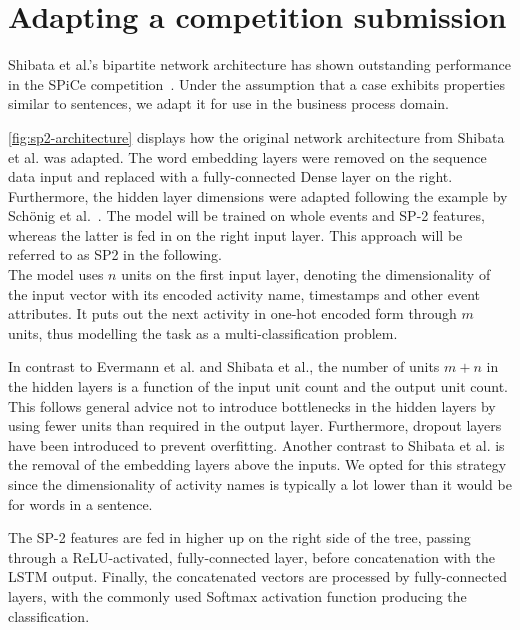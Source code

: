 \section{Adapting a competition submission}\label{sec:contrib:sp2-inspiration}
Shibata et al.'s bipartite network architecture has shown outstanding performance in the SPiCe competition~\cite{web:spice}. Under the assumption that a case exhibits properties similar to sentences, we adapt it for use in the business process domain.

\autoref{fig:sp2-architecture} displays how the original network architecture from Shibata et al. was adapted. The word embedding layers were removed on the sequence data input and replaced with a fully-connected Dense layer on the right. Furthermore, the hidden layer dimensions were adapted following the example by Schönig et al.~\cite{schoenig2018}. The model will be trained on whole events and SP-2 features, whereas the latter is fed in on the right input layer. This approach will be referred to as SP2 in the following.\\

The model uses $n$ units on the first input layer, denoting the dimensionality of the input vector with its encoded activity name, timestamps and other event attributes. It puts out the next activity in one-hot encoded form through $m$ units, thus modelling the task as a multi-classification problem.

In contrast to Evermann et al. and Shibata et al., the number of units $m+n$ in the hidden layers is a function of the input unit count and the output unit count. This follows general advice not to introduce bottlenecks in the hidden layers by using fewer units than required in the output layer. Furthermore, dropout layers have been introduced to prevent overfitting. Another contrast to Shibata et al. is the removal of the embedding layers above the inputs. We opted for this strategy since the dimensionality of activity names is typically a lot lower than it would be for words in a sentence.

The SP-2 features are fed in higher up on the right side of the tree, passing through a ReLU-activated, fully-connected layer, before concatenation with the LSTM output. Finally, the concatenated vectors are processed by fully-connected layers, with the commonly used Softmax activation function producing the classification.

